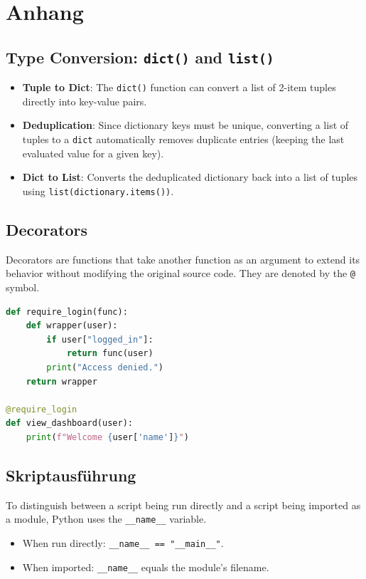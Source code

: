 \section{Anhang}\subsection{Type Conversion: \texttt{dict()} and \texttt{list()}}
\begin{itemize}
    \item \textbf{Tuple to Dict}: The \texttt{dict()} function can convert a list of 2-item tuples directly into key-value pairs.
    \item \textbf{Deduplication}: Since dictionary keys must be unique, converting a list of tuples to a \texttt{dict} automatically removes duplicate entries (keeping the last evaluated value for a given key).
    \item \textbf{Dict to List}: Converts the deduplicated dictionary back into a list of tuples using \texttt{list(dictionary.items())}.
\end{itemize}



\subsection{Decorators}
Decorators are functions that take another function as an argument to extend its behavior without modifying the original source code. They are denoted by the \texttt{@} symbol.

\begin{lstlisting}[language=Python]
def require_login(func):
    def wrapper(user):
        if user["logged_in"]:
            return func(user)
        print("Access denied.")
    return wrapper

@require_login
def view_dashboard(user):
    print(f"Welcome {user['name']}")
\end{lstlisting}


\subsection{Skriptausführung}To distinguish between a script being run directly and a script being imported as a module, Python uses the \texttt{\_\_name\_\_} variable.

\begin{itemize}
    \item When run directly: \texttt{\_\_name\_\_ == "\_\_main\_\_"}.
    \item When imported: \texttt{\_\_name\_\_} equals the module's filename.
\end{itemize}

